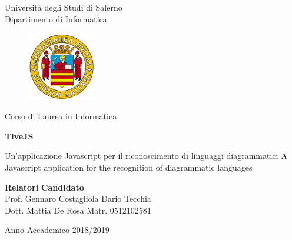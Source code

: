 \begin{titlepage}
\begin{center}


{\large Università degli Studi di Salerno}\\[0.2truecm]
{\large Dipartimento di Informatica}\\


\begin{figure}[htbp]
\centering
\includegraphics[height=3cm, width=3cm]{Figure/logounisa.png}
\end{figure}


{\large Corso di Laurea in Informatica}

\vfill\vfill

{\Huge \textbf{TiveJS}}

\vspace{0.2cm}

{\LARGE Un'applicazione Javascript per il riconoscimento di linguaggi diagrammatici
\newline\newline
A Javascript application for the recognition of diagrammatic languages} 

\vfill\vfill

{\bf Relatori}              \hfill {\bf Candidato}  \\
Prof. Gennaro Costagliola   \hfill Dario Tecchia  \\
Dott. Mattia De Rosa        \hfill Matr. 0512102581 \\

\vfill
\hrulefill 

Anno Accademico 2018/2019

\end{center}
\end{titlepage}